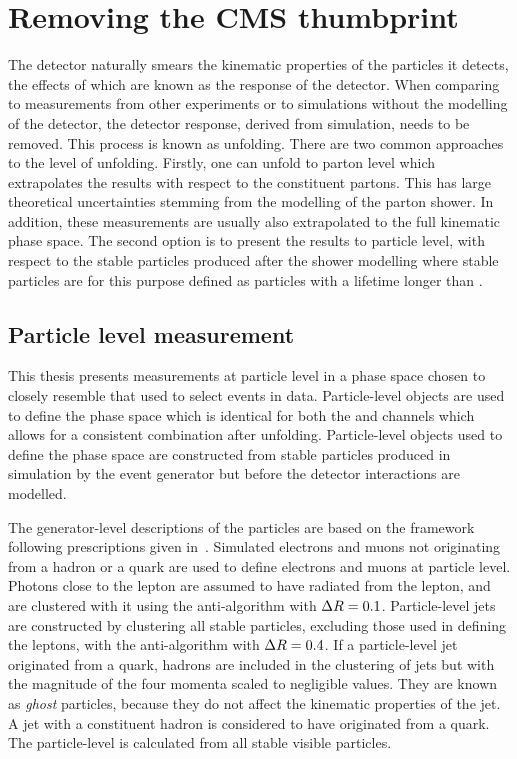 \chapter{Removing the CMS thumbprint}
\label{ch:unfolding}

The \CMS{} detector naturally smears the kinematic properties of the particles it detects, the effects of which are known as the response of the detector.
When comparing to measurements from other experiments or to simulations without the modelling of the detector, the detector response, derived from simulation, needs to be removed.
This process is known as unfolding.
There are two common approaches to the level of unfolding.
Firstly, one can unfold to parton level which extrapolates the results with respect to the constituent partons.
This has large theoretical uncertainties stemming from the modelling of the parton shower.
In addition, these measurements are usually also extrapolated to the full kinematic phase space.
The second option is to present the results to particle level, \ie{} with respect to the stable particles produced after the shower modelling where stable particles are for this purpose defined as particles with a lifetime longer than \particleLifetime{}.


\section{Particle level measurement} %
\label{sec:particle_level}

This thesis presents measurements at particle level in a phase space chosen to closely resemble that used to select events in data.
Particle-level objects are used to define the phase space which is identical for both the \eJets{} and \muJets{} channels which allows for a consistent combination after unfolding.
Particle-level objects used to define the phase space are constructed from stable particles produced in simulation by the event generator but before the detector interactions are modelled.

The generator-level descriptions of the particles are based on the \RIVET{} framework~\cite{Unfold:Rivet} following prescriptions given in~\cite{Unfold:pseudoTop}.
Simulated electrons and muons not originating from a hadron or a quark are used to define electrons and muons at particle level.  
Photons close to the lepton are assumed to have radiated from the lepton, and are clustered with it using the anti-\kt algorithm with $\Delta R=0.1$.  
Particle-level jets are constructed by clustering all stable particles, excluding those used in defining the leptons, with the anti-\kt algorithm with $\Delta R=0.4$.
If a particle-level jet originated from a \bquark{} quark, \bquark{} hadrons are included in the clustering of jets but with the magnitude of the four momenta scaled to negligible values. 
They are known as \textit{ghost} particles, because they do not affect the kinematic properties of the jet.
A jet with a constituent \bquark{} hadron is considered to have originated from a \bquark{} quark.
The particle-level \ptmiss{} is calculated from all stable visible particles.

